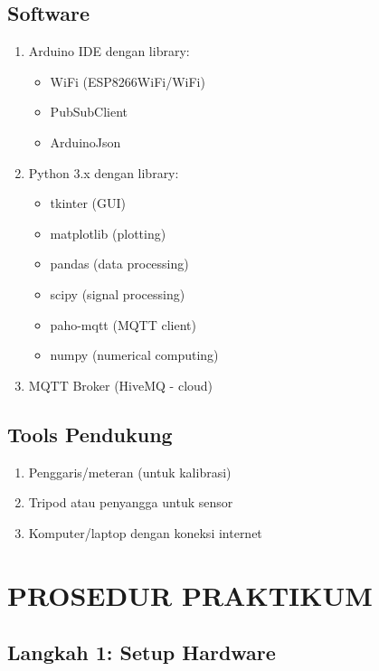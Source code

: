 \documentclass[12pt,a4paper]{article}
\begin{document}
\subsection{Software}
\begin{enumerate}
    \item Arduino IDE dengan library:
    \begin{itemize}
        \item WiFi (ESP8266WiFi/WiFi)
        \item PubSubClient
        \item ArduinoJson
    \end{itemize}
    \item Python 3.x dengan library:
    \begin{itemize}
        \item tkinter (GUI)
        \item matplotlib (plotting)
        \item pandas (data processing)
        \item scipy (signal processing)
        \item paho-mqtt (MQTT client)
        \item numpy (numerical computing)
    \end{itemize}
    \item MQTT Broker (HiveMQ - cloud)
\end{enumerate}

\subsection{Tools Pendukung}
\begin{enumerate}
    \item Penggaris/meteran (untuk kalibrasi)
    \item Tripod atau penyangga untuk sensor
    \item Komputer/laptop dengan koneksi internet
\end{enumerate}

\section{PROSEDUR PRAKTIKUM}

\subsection{Langkah 1: Setup Hardware}
\end{document}
